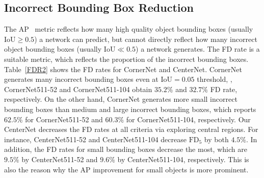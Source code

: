 \documentclass[10pt,twocolumn,letterpaper]{article}
\begin{document}
\subsection{Incorrect Bounding Box Reduction}
The AP~\cite{lin2014microsoft} metric reflects how many high quality object bounding boxes (usually $\mathrm{IoU} \geqslant 0.5$) a network can predict, but cannot directly reflect how many incorrect object bounding boxes (usually $\mathrm{IoU} \ll 0.5$) a network generates. The FD rate is a suitable metric, which reflects the proportion of the incorrect bounding boxes. Table~\ref{FDR2} shows the FD rates for CornerNet and CenterNet. CornerNet generates many incorrect bounding boxes even at $\mathrm{IoU} = 0.05$ threshold, \ie, CornerNet511-52 and CornerNet511-104 obtain $35.2\%$ and $32.7\%$ FD rate, respectively. On the other hand, CornerNet generates more small incorrect bounding boxes than medium and large incorrect bounding boxes, which reports $62.5\%$ for CornerNet511-52 and $60.3\%$ for CornerNet511-104, respectively. Our CenterNet decreases the FD rates at all criteria via exploring central regions. For instance, CenterNet511-52 and CenterNet511-104 decrease $\mathrm{FD_{5}}$ by both $4.5\%$. In addition, the FD rates for small bounding boxes decrease the most, which are $9.5\%$ by CenterNet511-52 and $9.6\%$ by CenterNet511-104, respectively. This is also the reason why the AP improvement for small objects is more prominent.
\begin{table}[tb]
\centering
{}
\vspace{-2ex}
\caption{Comparison of false discovery rates ($\%$) of CornerNet and CenterNet on the MS-COCO validation dataset. The results suggest CenterNet avoids a large number of incorrect bounding boxes, especially for small incorrect bounding boxes.}
\label{FDR2}
\vspace{-4ex}
\end{table}
\end{document}
